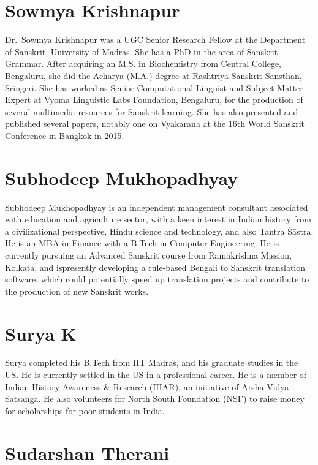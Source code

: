 \section*{Sowmya Krishnapur}

Dr.~Sowmya Krishnapur was a UGC Senior Research Fellow at the Department of Sanskrit, University of Madras. She has a PhD in the area of Sanskrit Grammar. After acquiring an M.S. in Biochemistry from Central College, Bengaluru, she did the Acharya (M.A.) degree at Rashtriya Sanskrit Sansthan, Sringeri. She has worked as Senior Computational Linguist and Subject Matter Expert at Vyoma Linguistic Labs Foundation, Bengaluru, for the production of several multimedia resources for Sanskrit learning. She has also presented and published several papers, notably one on Vyakarana at the 16th World Sanskrit Conference in Bangkok in 2015.

\section*{Subhodeep Mukhopadhyay}

Subhodeep Mukhopadhyay is an independent management consultant associated with education and agriculture sector, with a keen interest in Indian history from a civilizational perspective, Hindu science and technology, and also Tantra Śāstra. He is an MBA in Finance with a B.Tech in Computer Engineering. He is currently pursuing an Advanced Sanskrit course from Ramakrishna Mission, Kolkata, and is\break presently developing a rule-based Bengali to Sanskrit translation software, which could potentially speed up translation projects and contribute to the production of new Sanskrit works.

\section*{Surya K}

Surya completed his B.Tech from IIT Madras, and his graduate studies in the US. He is currently settled in the US in a professional career. He is a member of Indian History Awareness \& Research (IHAR), an initiative of Arsha Vidya Satsanga. He also volunteers for North South Foundation (NSF) to raise money for scholarships for poor students in India. 

\section*{Sudarshan Therani}

